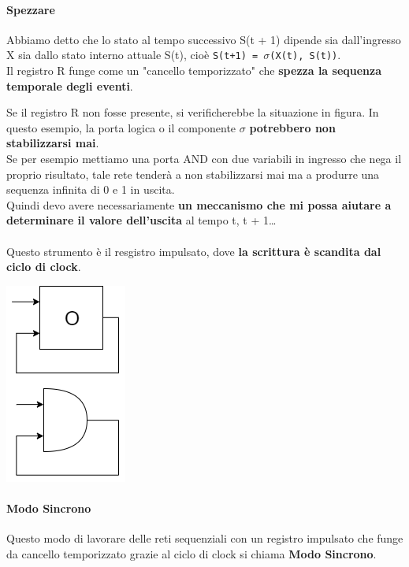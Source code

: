 \documentclass[10pt]{report}
\begin{document}
\paragraph{Spezzare} Abbiamo detto che lo stato al tempo successivo S(t + 1) dipende sia dall'ingresso X sia dallo stato interno attuale S(t), cioè \texttt{S(t+1) = $\sigma$(X(t), S(t))}.\\
Il registro R funge come un "cancello temporizzato" che \textbf{spezza la sequenza temporale degli eventi}.
\begin{multicols}{2}
Se il registro R non fosse presente, si verificherebbe la situazione in figura. In questo esempio, la porta logica o il componente $\sigma$ \textbf{potrebbero non stabilizzarsi mai}.\\
Se per esempio mettiamo una porta AND con due variabili in ingresso che nega il proprio risultato, tale rete tenderà a non stabilizzarsi mai ma a produrre una sequenza infinita di 0 e 1 in uscita.\\
Quindi devo avere necessariamente \textbf{un meccanismo che mi possa aiutare a determinare il valore dell'uscita} al tempo t, t + 1\ldots\\\\
Questo strumento è il resgistro impulsato, dove \textbf{la scrittura è scandita dal ciclo di clock}.
\columnbreak

\begin{center}
\includegraphics[scale=0.6]{esempiosincrono.png}
\end{center}
\end{multicols}
\paragraph{Modo Sincrono} Questo modo di lavorare delle reti sequenziali con un registro impulsato che funge da cancello temporizzato grazie al ciclo di clock si chiama \textbf{Modo Sincrono}.
\end{document}
